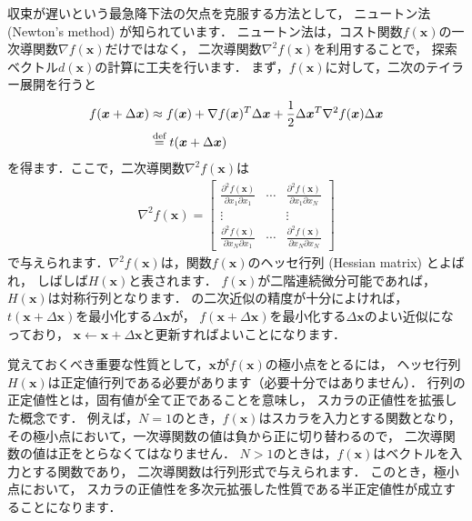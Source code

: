 収束が遅いという最急降下法の欠点を克服する方法として，
ニュートン法 (Newton's method) が知られています．
ニュートン法は，コスト関数$f(\bm{x})$の一次導関数$\nabla f(\bm{x})$だけではなく，
二次導関数$\nabla^2 f(\bm{x})$を利用することで，
探索ベクトル$d(\bm{x})$の計算に工夫を行います．
まず，$f(\bm{x})$に対して，二次のテイラー展開を行うと
\begin{align}
f(\bm{x} + \Delta \bm{x}) 
&\approx f(\bm{x}) + \nabla f(\bm{x})^T \Delta\bm{x}
+ \frac{1}{2} \Delta\bm{x}^T \nabla^2 f(\bm{x}) \Delta\bm{x}
\nonumber\\
&\overset{\mbox{\scriptsize def}}{=} t(\bm{x} + \Delta\bm{x})
\label{eq:fx_taylor}
\end{align}
を得ます．ここで，二次導関数$\nabla^2 f(\bm{x})$は
\begin{align}
\nabla^2 f(\bm{x}) =
  \begin{bmatrix}
    \displaystyle
    \frac{\partial^2 f(\bm{x})}{\partial x_1 \partial x_1} &
    \cdots&
    \displaystyle
    \frac{\partial^2 f(\bm{x})}{\partial x_1 \partial x_N}\\
    \vdots & & \vdots \\
    \displaystyle
    \frac{\partial^2 f(\bm{x})}{\partial x_N \partial x_1} &
    \cdots& 
    \displaystyle \frac{\partial^2 f(\bm{x})}{\partial x_N \partial x_N}    
  \end{bmatrix}
\end{align}
で与えられます．$\nabla^2 f(\bm{x})$は，関数$f(\bm{x})$のヘッセ行列 (Hessian matrix) とよばれ，
しばしば$H(\bm{x})$と表されます．
$f(\bm{x})$が二階連続微分可能であれば，$H(\bm{x})$は対称行列となります．
の二次近似の精度が十分によければ，
$t(\bm{x} + \Delta\bm{x})$を最小化する$\Delta\bm{x}$が，
$f(\bm{x} + \Delta\bm{x})$を最小化する$\Delta\bm{x}$のよい近似になっており，
$\bm{x} \gets \bm{x} + \Delta\bm{x}$と更新すればよいことになります．

覚えておくべき重要な性質として，$\bm{x}$が$f(\bm{x})$の極小点をとるには，
ヘッセ行列$H(\bm{x})$は正定値行列である必要があります（必要十分ではありません）．
行列の正定値性とは，固有値が全て正であることを意味し，
スカラの正値性を拡張した概念です．
例えば，$N=1$のとき，$f(\bm{x})$はスカラを入力とする関数となり，
その極小点において，一次導関数の値は負から正に切り替わるので，
二次導関数の値は正をとらなくてはなりません．
$N > 1$のときは，$f(\bm{x})$はベクトルを入力とする関数であり，
二次導関数は行列形式で与えられます．
このとき，極小点において，
スカラの正値性を多次元拡張した性質である半正定値性が成立することになります．

